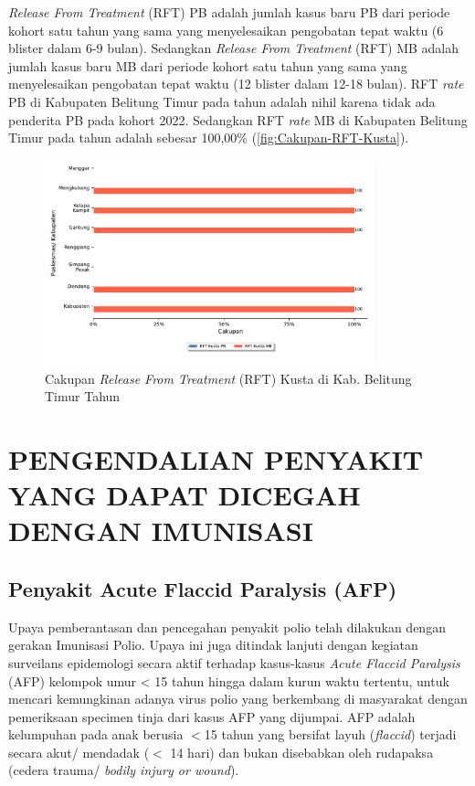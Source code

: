 \emph{Release From Treatment} (RFT) PB adalah jumlah kasus baru PB dari periode kohort satu tahun yang sama yang menyelesaikan pengobatan tepat waktu (6 blister dalam 6-9 bulan).
Sedangkan \emph{Release From Treatment} (RFT) MB adalah jumlah kasus baru MB dari periode kohort satu tahun yang sama yang menyelesaikan pengobatan tepat waktu (12 blister dalam 12-18 bulan).
RFT \emph{rate} PB di Kabupaten Belitung Timur pada tahun \tP adalah nihil karena tidak ada penderita PB pada kohort 2022. Sedangkan RFT \emph{rate} MB di Kabupaten Belitung Timur pada tahun \tP adalah sebesar 100,00\% (\autoref{fig:Cakupan-RFT-Kusta}).

\begin{figure}[H]
  \centering
  \includegraphics[width=0.85\textwidth]{bab_06/bab_06_06c_RFTkusta}
  \caption{Cakupan \emph{Release From Treatment} (RFT) Kusta di Kab. Belitung Timur Tahun \tP}
  \label{fig:Cakupan-RFT-Kusta}
\end{figure}

\section[PENGENDALIAN PD3I]{PENGENDALIAN PENYAKIT YANG DAPAT DICEGAH DENGAN IMUNISASI}
\subsection{Penyakit Acute Flaccid Paralysis (AFP)}
Upaya pemberantasan dan pencegahan penyakit polio telah dilakukan dengan gerakan Imunisasi Polio.
Upaya ini juga ditindak lanjuti dengan kegiatan surveilans epidemologi secara aktif terhadap kasus-kasus \emph{Acute Flaccid Paralysis} (AFP) kelompok umur < 15 tahun hingga dalam kurun waktu tertentu, untuk mencari kemungkinan adanya virus polio yang berkembang di masyarakat dengan pemeriksaan specimen tinja dari kasus AFP yang dijumpai.
AFP adalah kelumpuhan pada anak berusia $<$15 tahun yang bersifat layuh (\emph{flaccid}) terjadi secara akut/ mendadak ($<$ 14 hari) dan bukan disebabkan oleh rudapaksa (cedera trauma/ \emph{bodily injury or wound}).

